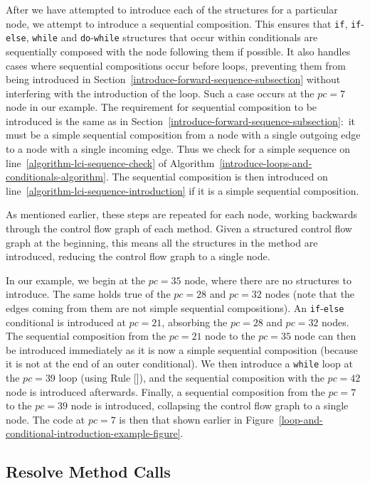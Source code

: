 After we have attempted to introduce each of the structures for a
particular node, we attempt to introduce a sequential composition.
This ensures that \texttt{if}, \texttt{if}-\texttt{else},
\texttt{while} and \texttt{do}-\texttt{while} structures that occur
within conditionals are sequentially composed with the node following
them if possible.
It also handles cases where sequential compositions occur before
loops, preventing them from being introduced in
Section~\ref{introduce-forward-sequence-subsection} without
interfering with the introduction of the loop.
Such a case occurs at the $pc=7$ node in our example.
The requirement for sequential composition to be introduced is the
same as in Section~\ref{introduce-forward-sequence-subsection}:~it
must be a simple sequential composition from a node with a single
outgoing edge to a node with a single incoming edge.
Thus we check for a simple sequence on
line~\ref{algorithm-lci-sequence-check} of
Algorithm~\ref{introduce-loops-and-conditionals-algorithm}.
The sequential composition is then introduced on
line~\ref{algorithm-lci-sequence-introduction} if it is a simple
sequential composition.

As mentioned earlier, these steps are repeated for each node, working
backwards through the control flow graph of each method.
Given a structured control flow graph at the beginning, this means all
the structures in the method are introduced, reducing the control flow
graph to a single node.

In our example, we begin at the $pc=35$ node, where there are no
structures to introduce. 
The same holds true of the $pc=28$ and $pc=32$ nodes (note that the
edges coming from them are not simple sequential compositions).
An \texttt{if}-\texttt{else} conditional is introduced at $pc=21$,
absorbing the $pc=28$ and $pc=32$ nodes.
The sequential composition from the $pc=21$ node to the $pc=35$ node
can then be introduced immediately as it is now a simple sequential
composition (because it is not at the end of an outer conditional).
We then introduce a \texttt{while} loop at the $pc=39$ loop (using
Rule []), and the sequential composition
with the $pc=42$ node is introduced afterwards.
Finally, a sequential composition from the $pc=7$ to the $pc=39$ node
is introduced, collapsing the control flow graph to a single node.
The code at $pc=7$ is then that shown earlier in
Figure~\ref{loop-and-conditional-introduction-example-figure}.

\subsection{Resolve Method Calls}
\label{resolve-method-calls-subsection}

